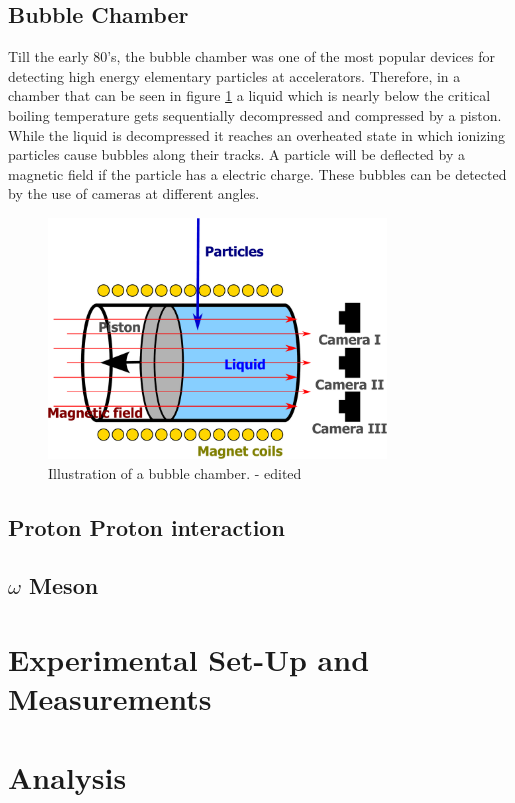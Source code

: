 \documentclass[10pt, a4paper, notitlepage, DIV=15]{scrartcl}
\begin{document}
\subsection{Bubble Chamber}
Till the early 80's, the bubble chamber was one of the most popular devices for detecting high energy elementary particles at accelerators. Therefore, in  a chamber that can be seen in figure \ref*{fig:bubble-chamber} a liquid which is nearly below the critical boiling temperature gets sequentially decompressed and compressed by a piston. While the liquid is decompressed it reaches an overheated state in which ionizing particles cause bubbles along their tracks. A particle will be deflected by a magnetic field if the particle has a electric charge. These bubbles can be detected by the use of cameras at different angles.   
\begin{figure}[h]
	\centering
	\includegraphics[width=0.8\textwidth]{bubble-chamber}
	\caption{Illustration of a bubble chamber. \cite{wiki-bubble} - edited}
	\label{fig:bubble-chamber}
\end{figure}
\FloatBarrier
\subsection{Proton Proton interaction}
\subsection{$\omega$ Meson}

\section{Experimental Set-Up and Measurements}

\section{Analysis}
\end{document}
